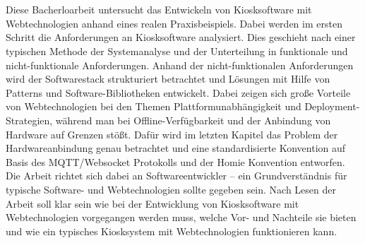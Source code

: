 \chapter{\abstractname}

Diese Bacherloarbeit untersucht das Entwickeln von Kiosksoftware mit Webtechnologien
anhand eines realen Praxisbeispiels. Dabei werden im ersten Schritt die Anforderungen
an Kiosksoftware analysiert. Dies geschieht nach einer typischen Methode der Systemanalyse
und der Unterteilung in funktionale und nicht-funktionale Anforderungen. 
Anhand der nicht-funktionalen Anforderungen
wird der Softwarestack strukturiert betrachtet und Lösungen mit Hilfe von Patterns und 
Software-Bibliotheken entwickelt. 
Dabei zeigen sich große Vorteile von Webtechnologien bei den Themen
Plattformunabhängigkeit und Deployment-Strategien, während man bei Offline-Verfügbarkeit und der
Anbindung von Hardware auf Grenzen stößt. Dafür wird im letzten Kapitel das Problem der
Hardwareanbindung genau betrachtet und eine standardisierte Konvention auf
Basis des MQTT/Websocket Protokolls und der Homie Konvention entworfen.\\
Die Arbeit richtet sich dabei an Softwareentwickler -- ein Grundverständnis für typische 
Software- und Webtechnologien sollte gegeben sein. Nach Lesen der Arbeit soll klar sein
wie bei der Entwicklung von Kiosksoftware mit Webtechnologien vorgegangen werden muss, welche
Vor- und Nachteile sie bieten und wie ein typisches Kiosksystem mit Webtechnologien funktionieren
kann. \\

\iffalse
- wie typische Anforderungen an Kiosksoftware mit Webtechnologien erfüllt werden können
- zum Beispiel Offline Verfügbarkeit und Geschlosssenheit 
\fi

